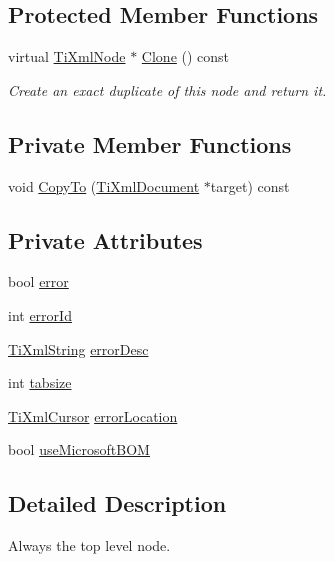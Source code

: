 \subsection*{Protected Member Functions}
\begin{DoxyCompactItemize}
\item 
virtual \hyperlink{class_ti_xml_node}{TiXmlNode} $\ast$ \hyperlink{class_ti_xml_document_ac9e8f09b23454d953b32d1b65cd1409e}{Clone} () const 
\begin{DoxyCompactList}\small\item\em Create an exact duplicate of this node and return it. \end{DoxyCompactList}\end{DoxyCompactItemize}
\subsection*{Private Member Functions}
\begin{DoxyCompactItemize}
\item 
void \hyperlink{class_ti_xml_document_af69deeb984e060bd00f668460dec8ef2}{CopyTo} (\hyperlink{class_ti_xml_document}{TiXmlDocument} $\ast$target) const 
\end{DoxyCompactItemize}
\subsection*{Private Attributes}
\begin{DoxyCompactItemize}
\item 
bool \hyperlink{class_ti_xml_document_a1ff6a063602f31acae6f37fc049d8bbd}{error}
\item 
int \hyperlink{class_ti_xml_document_acdef97a4bb80729ac6863dd54cee7eeb}{errorId}
\item 
\hyperlink{class_ti_xml_string}{TiXmlString} \hyperlink{class_ti_xml_document_acdcc006167a6ba3bf8d8c7c1651cb03c}{errorDesc}
\item 
int \hyperlink{class_ti_xml_document_af2fa6a010b903d893d52cc6fee5575a1}{tabsize}
\item 
\hyperlink{struct_ti_xml_cursor}{TiXmlCursor} \hyperlink{class_ti_xml_document_aa4030f989f1549f6b897147fc2851d1a}{errorLocation}
\item 
bool \hyperlink{class_ti_xml_document_a4d5400dec9bfb55c640428de33297886}{useMicrosoftBOM}
\end{DoxyCompactItemize}


\subsection{Detailed Description}
Always the top level node. 

